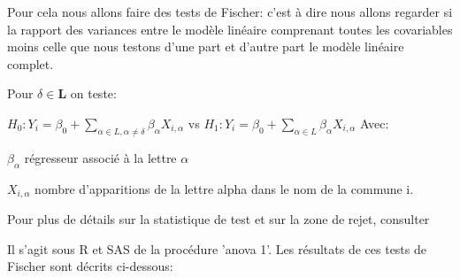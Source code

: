 \documentclass[french]{article}%
\begin{document}
		Pour cela nous allons faire des tests de Fischer: c'est à dire nous allons regarder si la rapport des variances entre le modèle linéaire comprenant toutes les covariables moins celle que nous testons d'une part et d'autre part le modèle linéaire complet.
		
		Pour $\delta \in \mathbf{L}$ on teste:
		
		$H_{0}:Y_{i}=\beta_{0}+\sum_{\alpha\in L, \alpha \ne \delta}\beta_{\alpha}X_{i,\alpha}$ vs $H_{1}:Y_{i}=\beta_{0}+\sum_{\alpha\in L}\beta_{\alpha}X_{i,\alpha}$ Avec:
		
		$\beta_{\alpha}$ régresseur associé à la lettre $\alpha$
		
		$X_{i,\alpha}$ nombre d'apparitions de la lettre alpha dans le nom de la commune i.
		
		Pour plus de détails sur la statistique de test et sur la zone de rejet, consulter \cite{Donnet}
		
		Il s'agit sous R et SAS de la procédure 'anova 1'. Les résultats de ces tests de Fischer sont décrits ci-dessous:
		
%			
%			
%			

%					
%						
%						
\end{document}
